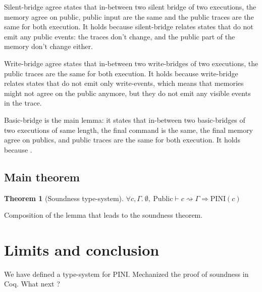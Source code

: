 \documentclass[10pt]{article}
\newcommand{\ctx}{\Gamma}
\newcommand{\typing}[4]{ #1,~#2 \vdash #3 \rightsquigarrow #4}
\newcommand{\pini}[1]{\mathrm{PINI}(#1)}
\newtheorem{theorem}{Theorem}
\begin{document}
Silent-bridge agree states that in-between two silent bridge of two executions,
the memory agree on public, public input are the same and the public
traces are the same for both execution. It holds because silent-bridge relates states that do not
emit any public events: the traces don't change, and the public part of the memory don't change
either.

Write-bridge agree states that in-between two write-bridges of two executions,
the public traces are the same for both execution. It holds because write-bridge relates states that
do not emit only write-events, which means that memories might not agree on the public anymore, but
they do not emit any visible events in the trace.

Basic-bridge is the main lemma: it states that in-between two basic-bridges of two executions of
same length, the final command is the same, the final memory agree on publics, and
public traces are the same for both execution.
It holds because .


\subsection{Main theorem}%
\label{subsec:main_theorem}

\begin{theorem}[Soundness type-system]
  \( \forall c, \ctx.\
  \typing{\emptyset}{\mathrm{Public}}{c}{\ctx}
  \Rightarrow \pini{c}
  \)
\end{theorem}

Composition of the lemma that leads to the soundness theorem.

\section{Limits and conclusion}%
\label{sec:conclusion}

We have defined a type-system for PINI. Mechanized the proof of soundness in Coq.
What next ?




\end{document}
